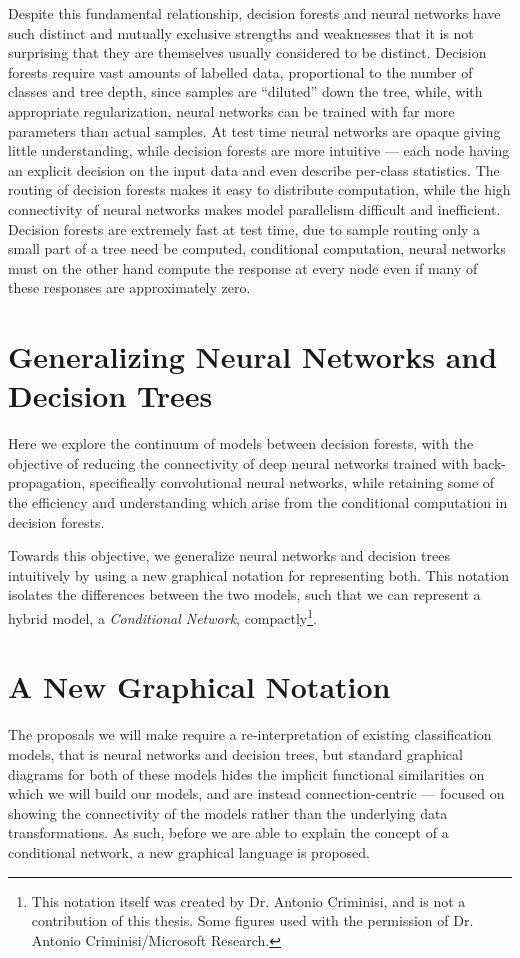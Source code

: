 \documentclass[thesis]{subfiles}
\begin{document}
	Despite this fundamental relationship, decision forests and neural networks have such distinct and mutually exclusive strengths and weaknesses that it is not surprising that they are themselves usually considered to be distinct. Decision forests require vast amounts of labelled data, proportional to the number of classes and tree depth, since samples are ``diluted'' down the tree, while, with appropriate regularization, neural networks can be trained with far more parameters than actual samples. At test time neural networks are opaque giving little understanding, while decision forests are more intuitive --- each node having an explicit decision on the input data and even describe per-class statistics. The routing of decision forests makes it easy to distribute computation, while the high connectivity of neural networks makes model parallelism difficult and inefficient. Decision forests are extremely fast at test time, due to sample routing only a small part of a tree need be computed, \ie{}conditional computation, neural networks must on the other hand compute the response at every node even if many of these responses are approximately zero.
	
	\section{Generalizing Neural Networks and Decision Trees}
	Here we explore the continuum of models between decision forests, with the objective of reducing the connectivity of deep neural networks trained with back-propagation, specifically convolutional neural networks, while retaining some of the efficiency and understanding which arise from the conditional computation in decision forests.
	
	Towards this objective, we generalize neural networks and decision trees intuitively by using a new graphical notation for representing both. This notation isolates the differences between the two models, such that we can represent a hybrid model, \ie a \emph{Conditional Network}, compactly\footnote{This notation itself was created by Dr. Antonio Criminisi, and is not a contribution of this thesis. Some figures used with the permission of Dr. Antonio Criminisi/Microsoft Research.}.
	
	\section{A New Graphical Notation}
	The proposals we will make require a re-interpretation of existing classification models, that is neural networks and decision trees, but standard graphical diagrams for both of these models hides the implicit functional similarities on which we will build our models, and are instead connection-centric --- focused on showing the connectivity of the models rather than the underlying data transformations. As such, before we are able to explain the concept of a conditional network, a new graphical language is proposed.
	
\end{document}
